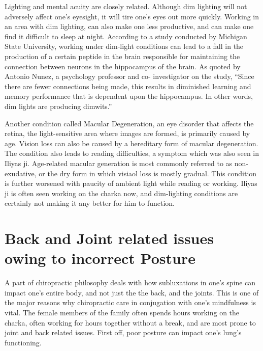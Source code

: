 \documentclass[journal]{IEEEtran}
\begin{document}
\par 
Lighting and mental acuity are closely related. Although dim lighting will not adversely affect one’s eyesight, it will tire one’s eyes out more quickly. Working in an area with dim lighting, can also make one less productive, and can make one find it difficult to sleep at night.  According to a study conducted by Michigan State University, working under dim-light conditions can lead to a fall in the production of a certain peptide in the brain responsible for maintaining the connection between neurons in the hippocampus of the brain. As quoted by Antonio Nunez, a psychology professor and co- investigator on the study, “Since there are fewer connections being made, this results in diminished learning and memory performance that is dependent upon the hippocampus. In other words, dim lights are producing dimwits.” 
\par 
Another condition called Macular Degeneration, an eye disorder that affects the retina, the light-sensitive area where images are formed, is primarily caused by age. Vision loss can also be caused by a hereditary form of macular degeneration. The condition also leads to reading difficulties, a symptom which was also seen in Iliyas ji. Age-related macular generation is most commonly referred to as non-exudative, or the dry form in which visiaol loss is mostly gradual. This condition is further worsened with paucity of ambient light while reading or working. Iliyas ji is often seen working on the charka now, and dim-lighting conditions are certainly not making it any better for him to function.



 

\section{Back and Joint related issues owing to incorrect Posture}

 A part of chiropractic philosophy deals with how subluxations in one’s spine can impact one’s entire body, and not just the the back, and the joints. This is one of the major reasons why chiropractic care in conjugation with one’s mindfulness is vital. The female members of the family often spends hours working on the charka, often working for hours together without a break, and are most prone to joint and back related issues. First off, poor posture can impact one’s lung’s functioning.

\par
\end{document}
